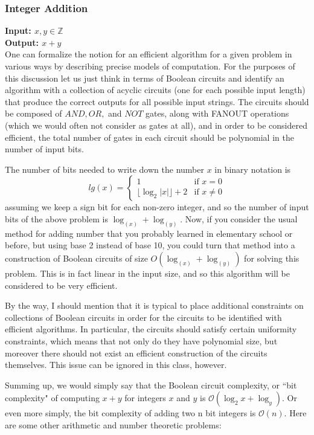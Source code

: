 \subsubsection{Integer Addition}
\textbf{Input: $x,y\in \mathbb{Z}$}\\
\textbf{Output: $x+y$}\\

One can formalize the notion for an efficient algorithm for a given problem in various ways by describing precise models of computation. For the purposes of this discussion let us just think in terms of Boolean circuits and identify an algorithm with a collection of acyclic circuits (one for each possible input length) that produce the correct outputs for all possible input strings. The circuits should be composed of $AND,OR,$ and $NOT$ gates, along with FANOUT operations (which we would often not consider as gates at all), and in order to be considered efficient, the total number of gates in each circuit should be polynomial in the number of input bits.

The number of bits needed to write down the number $x$ in binary notation is
\[
lg(x)=\begin{cases} 1 & \text{if } x=0 \\ \lfloor \log_2 |x|\rfloor+2 & \text{if } x \neq 0 \end{cases}
\]
assuming we keep a sign bit for each non-zero integer, and so the number of input bits of the above problem is $\log_(x)+\log_(y)$. Now, if you consider the usual method for adding number that you probably learned in elementary school or before, but using base 2 instead of base 10, you could turn that method into a construction of Boolean circuits of size $O(\log_(x)+\log_(y))$ for solving this problem. This is in fact linear in the input size, and so this algorithm will be considered to be very efficient.

By the way, I should mention that it is typical to place additional constraints on collections of Boolean circuits in order for the circuits to be identified with efficient algorithms. In particular, the circuits should satisfy certain uniformity constraints, which means that not only do they have polynomial size, but moreover there should not exist an efficient construction of the circuits themselves. This issue can be ignored in this class, however.

Summing up, we would simply say that the Boolean circuit complexity, or ``bit complexity" of computing $x+y$ for integers $x$ and $y$ is $\mathcal{O}(\log_2 x + \log_ y)$. Or even more simply, the bit complexity of adding two n bit integers is $\mathcal{O}(n)$.
Here are some other arithmetic and number theoretic problems:

